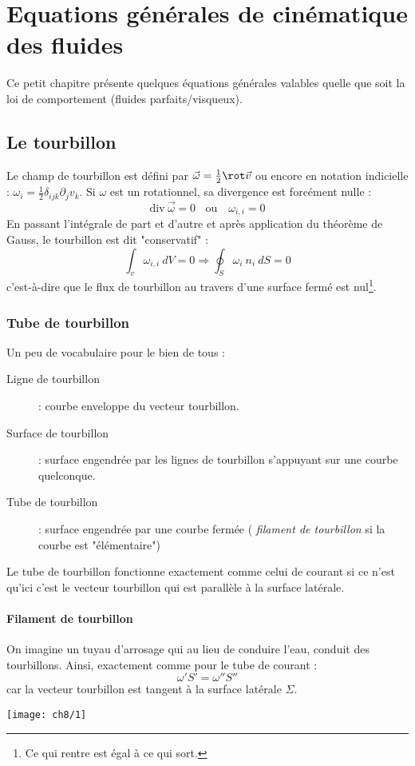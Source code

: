 \chapter{Equations générales de cinématique des fluides}
Ce petit chapitre présente quelques équations générales valables quelle que
soit la loi de comportement (fluides parfaits/visqueux).

\section{Le tourbillon}
Le champ de tourbillon est défini par $\vec{\omega} = \frac{1}{2}\rot \vec{v}$ 
ou encore en notation indicielle : $\omega_i = \frac{1}{2}\delta_{ijk}\partial_j
v_k$. Si $\omega$ est un rotationnel, sa divergence est forcément nulle :
\begin{equation}
	\text{div}\ \vec\omega = 0\ \ \ \ \text{ou }\ \ \ \omega_{i,i} = 0
\end{equation}
En passant l'intégrale de part et d'autre et après application du théorème de 
Gauss, le tourbillon est dit "conservatif" : 
\begin{equation}
	\int_v \omega_{i,i}\ dV = 0 \Rightarrow \oint_S \omega_i\ n_i\ dS = 0
\end{equation}
c'est-à-dire que le flux de tourbillon au travers d'une surface fermé est 
nul\footnote{Ce qui rentre est égal à ce qui sort.}.

\subsection{Tube de tourbillon}
Un peu de vocabulaire pour le bien de tous :
\begin{description}
	\item[Ligne de tourbillon] : courbe enveloppe du vecteur tourbillon.
	\item[Surface de tourbillon] : surface engendrée par les lignes de 
	tourbillon s'appuyant sur une courbe quelconque.
	\item[Tube de tourbillon] : surface engendrée par une courbe fermée (
	\textit{filament de tourbillon} si la courbe est "élémentaire")
\end{description}
Le tube de tourbillon fonctionne exactement comme celui de courant si ce 
n'est qu'ici c'est le vecteur tourbillon qui est parallèle à la surface 
latérale.
	
\subsubsection{Filament de tourbillon}
On imagine un tuyau d'arrosage qui au lieu de conduire l'eau, conduit 
des tourbillons. Ainsi, exactement comme pour le tube de courant :
\begin{equation}
	\omega'S' = \omega''S''
\end{equation}
car la vecteur tourbillon est tangent à la surface latérale $\Sigma$.\\
\begin{center}
	\texttt{[image: ch8/1]}
\end{center}
		
